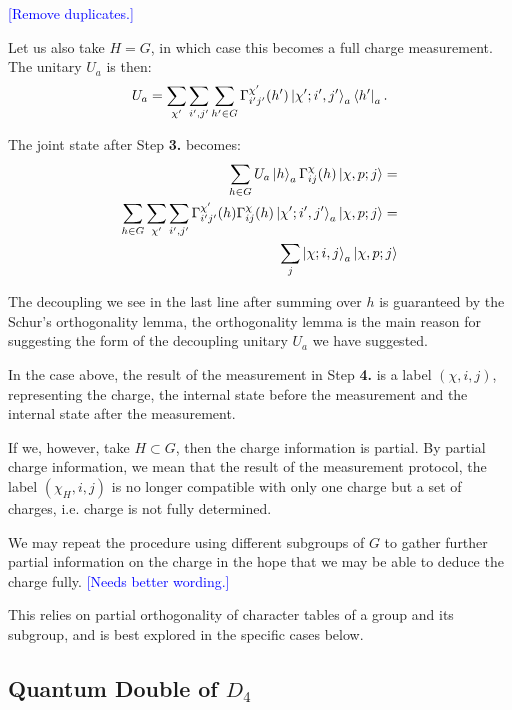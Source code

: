 \documentclass[two column]{article}
\newcommand{\jovan}[1]{\textcolor{blue}{[#1]}}
\begin{document}
\jovan{Remove duplicates.}

Let us also take $H = G$, in which case this becomes a full charge measurement. The unitary $U_a$ is then: \begin{equation}
    U_a = \sum_{\chi'}\sum_{i', j'}\sum_{h'\in G}  \Gamma^{\chi'}_{i'j'}(h') \ket{\chi'; i', j'}_a\bra{h'}_a.
\end{equation}

The joint state after Step \textbf{3.} becomes:\begin{equation}
    \begin{split}
        \sum_{h \in G} U_a\ket{h}_a \Gamma^{\chi}_{ij}(h) \ket{\chi, p; j} = \\
        \sum_{h \in G} \sum_{\chi'}\sum_{i', j'}  \Gamma^{\chi'}_{i'j'}(h)\Gamma^{\chi}_{ij}(h) \ket{\chi'; i', j'}_a \ket{\chi, p; j} =\\
        \sum_j\ket{\chi; i, j}_a \ket{\chi, p; j}
    \end{split}
\end{equation}

The decoupling we see in the last line after summing over $h$ is guaranteed by the Schur's orthogonality lemma, the orthogonality lemma is the main reason for suggesting the form of the decoupling unitary $U_a$ we have suggested.

In the case above, the result of the measurement in Step \textbf{4.} is a label $(\chi, i, j)$, representing the charge, the internal state before the measurement and the internal state after the measurement.

If we, however, take $H \subset G$, then the charge information is partial.
By partial charge information, we mean that the result of the measurement protocol, the label $(\chi_H, i, j)$ is no longer compatible with only one charge but a set of charges, i.e. charge is not fully determined.

We may repeat the procedure using different subgroups of $G$ to gather further partial information on the charge in the hope that we may be able to deduce the charge fully. \jovan{Needs better wording.}

This relies on partial orthogonality of character tables of a group and its subgroup, and is best explored in the specific cases below.

\subsection{Quantum Double of $D_4$}
\end{document}
